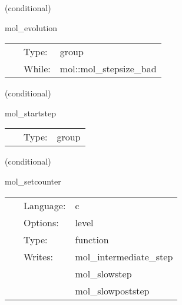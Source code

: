    (conditional) 

\hspace{5mm} mol\_evolution 

\hspace{5mm}{\it a single cactus evolution step using mol } 


\hspace{5mm}

 \begin{tabular*}{160mm}{cll} 
~ & Type:  & group \\ 
~ & While:  & mol::mol\_stepsize\_bad \\ 
\end{tabular*} 


\vspace{5mm}

   (conditional) 

\hspace{5mm} mol\_startstep 

\hspace{5mm}{\it mol internal setup for the evolution step } 


\hspace{5mm}

 \begin{tabular*}{160mm}{cll} 
~ & Type:  & group \\ 
\end{tabular*} 


\vspace{5mm}

   (conditional) 

\hspace{5mm} mol\_setcounter 

\hspace{5mm}{\it set the counter for the ode method to loop over } 


\hspace{5mm}

 \begin{tabular*}{160mm}{cll} 
~ & Language:  & c \\ 
~ & Options:  & level \\ 
~ & Type:  & function \\ 
~ & Writes:  & mol\_intermediate\_step \\ 
~& ~ &mol\_slowstep\\ 
~& ~ &mol\_slowpoststep\\ 
\end{tabular*} 


